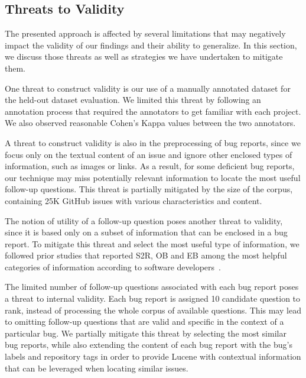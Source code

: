 

\subsection{Threats to Validity}
The presented approach is affected by several limitations that may negatively impact the validity of our findings and their ability to generalize. In this section, we discuss those threats as well as strategies we have undertaken to mitigate them.

One threat to construct validity is our use of a manually annotated dataset for the held-out dataset evaluation. We limited this threat by following an annotation process that required the annotators to get familiar with each project. We also observed reasonable Cohen's Kappa values between the two annotators.

A threat to construct validity is also in the preprocessing of bug reports, since we focus only on the textual content of an issue and ignore other enclosed types of information, such as images or links. As a result, for some deficient bug reports, our technique may miss potentially relevant information to locate the most useful follow-up questions. This threat is partially mitigated by the size of the corpus, containing 25K GitHub issues with various characteristics and content.

The notion of utility of a follow-up question poses another threat to validity, since it is based only on a subset of information that can be enclosed in a bug report. To mitigate this threat and select the most useful type of information, we followed prior studies that reported S2R, OB and EB among the most helpful categories of information according to software developers~\cite{Zimmermann2010}.



The limited number of follow-up questions associated with each bug report poses a threat to internal validity. Each bug report is assigned 10 candidate question to rank, instead of processing the whole corpus of available questions. This  may lead to omitting follow-up questions that are valid and specific in the context of a particular bug. We partially mitigate this threat by selecting the most similar bug reports, while also extending the content of each bug report with the bug's labels and repository tags in order to provide Lucene with contextual information that can be leveraged when locating similar issues.


